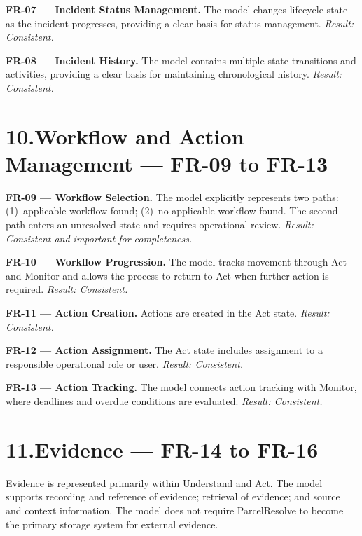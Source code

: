 \documentclass[11pt,a4paper]{article}
\begin{document}
\textbf{FR-07 — Incident Status Management.} The model changes lifecycle state as the incident progresses, providing a clear basis for status management. \textit{Result: Consistent.}

\textbf{FR-08 — Incident History.} The model contains multiple state transitions and activities, providing a clear basis for maintaining chronological history. \textit{Result: Consistent.}

\section*{10.\enspace Workflow and Action Management — FR-09 to FR-13}

\textbf{FR-09 — Workflow Selection.} The model explicitly represents two paths: (1)~applicable workflow found; (2)~no applicable workflow found. The second path enters an unresolved state and requires operational review. \textit{Result: Consistent and important for completeness.}

\textbf{FR-10 — Workflow Progression.} The model tracks movement through Act and Monitor and allows the process to return to Act when further action is required. \textit{Result: Consistent.}

\textbf{FR-11 — Action Creation.} Actions are created in the Act state. \textit{Result: Consistent.}

\textbf{FR-12 — Action Assignment.} The Act state includes assignment to a responsible operational role or user. \textit{Result: Consistent.}

\textbf{FR-13 — Action Tracking.} The model connects action tracking with Monitor, where deadlines and overdue conditions are evaluated. \textit{Result: Consistent.}

\section*{11.\enspace Evidence — FR-14 to FR-16}

Evidence is represented primarily within Understand and Act. The model supports recording and reference of evidence; retrieval of evidence; and source and context information. The model does not require ParcelResolve to become the primary storage system for external evidence.
\end{document}

